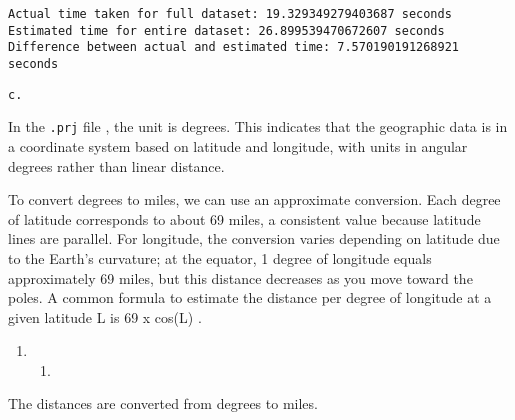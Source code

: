 \documentclass[
  letterpaper,
  DIV=11,
  numbers=noendperiod]{scrartcl}
\providecommand{\tightlist}{%
  \setlength{\itemsep}{0pt}\setlength{\parskip}{0pt}}\usepackage{longtable,booktabs,array}
\begin{document}
\begin{verbatim}
Actual time taken for full dataset: 19.329349279403687 seconds
Estimated time for entire dataset: 26.899539470672607 seconds
Difference between actual and estimated time: 7.570190191268921 seconds
\end{verbatim}

\begin{verbatim}
c.
\end{verbatim}

In the \texttt{.prj} file , the unit is degrees. This indicates that the
geographic data is in a coordinate system based on latitude and
longitude, with units in angular degrees rather than linear distance.

To convert degrees to miles, we can use an approximate conversion. Each
degree of latitude corresponds to about 69 miles, a consistent value
because latitude lines are parallel. For longitude, the conversion
varies depending on latitude due to the Earth's curvature; at the
equator, 1 degree of longitude equals approximately 69 miles, but this
distance decreases as you move toward the poles. A common formula to
estimate the distance per degree of longitude at a given latitude L is
69 x cos(L) .

\begin{enumerate}
\def\labelenumi{\arabic{enumi}.}
\setcounter{enumi}{4}
\tightlist
\item
  \begin{enumerate}
  \def\labelenumii{\alph{enumii}.}
  \tightlist
  \item
  \end{enumerate}
\end{enumerate}

The distances are converted from degrees to miles.
\end{document}
